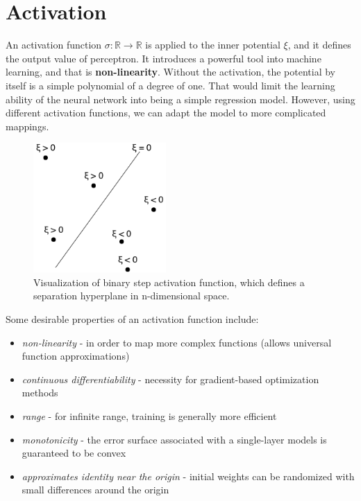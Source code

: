 \section{Activation}

An activation function $\sigma: \mathbb{R} \rightarrow \mathbb{R}$ is applied to the inner potential $\xi$, and it defines the output value of perceptron. It introduces a powerful tool into machine learning, and that is \textbf{non-linearity}. Without the activation, the potential by itself is a simple polynomial of a degree of one. That would limit the learning ability of the neural network into being a simple regression model. However, using different activation functions, we can adapt the model to more complicated mappings.

\begin{figure}[h]

\centering
\includegraphics[width=0.45\textwidth]{tex/images/activation-vis}
\caption{Visualization of binary step activation function, which defines a separation hyperplane in n-dimensional space.}
\end{figure}

\noindent
Some desirable properties\cite{wiki:activation} of an activation function include:

\begin{itemize}

\item \textit{non-linearity} - in order to map more complex functions (allows universal function approximations)
\item \textit{continuous differentiability} - necessity for gradient-based optimization methods
\item \textit{range} - for infinite range, training is generally more efficient
\item \textit{monotonicity} - the error surface associated with a single-layer models is guaranteed to be convex
\item \textit{approximates identity near the origin} - initial weights can be randomized with small differences around the origin

\end{itemize}

